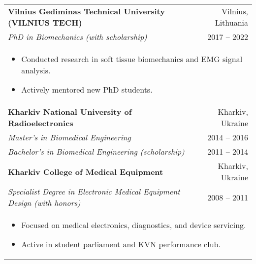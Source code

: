 \begin{tabularx}{\textwidth}{Xr}
\textbf{Vilnius Gediminas Technical University (VILNIUS TECH)} & Vilnius, Lithuania \\
\textit{PhD in Biomechanics (with scholarship)} & 2017 -- 2022 \\
\multicolumn{2}{l}{\begin{itemize}[leftmargin=*]
  \item Conducted research in soft tissue biomechanics and EMG signal analysis.
  \item Actively mentored new PhD students.
\end{itemize}} \\
\addlinespace

\textbf{Kharkiv National University of Radioelectronics} & Kharkiv, Ukraine \\
\textit{Master's in Biomedical Engineering} & 2014 -- 2016 \\
\textit{Bachelor's in Biomedical Engineering (scholarship)} & 2011 -- 2014 \\
\addlinespace

\textbf{Kharkiv College of Medical Equipment} & Kharkiv, Ukraine \\
\textit{Specialist Degree in Electronic Medical Equipment Design (with honors)} & 2008 -- 2011 \\
\multicolumn{2}{l}{\begin{itemize}[leftmargin=*]
  \item Focused on medical electronics, diagnostics, and device servicing.
  \item Active in student parliament and KVN performance club.
\end{itemize}}
\end{tabularx}
